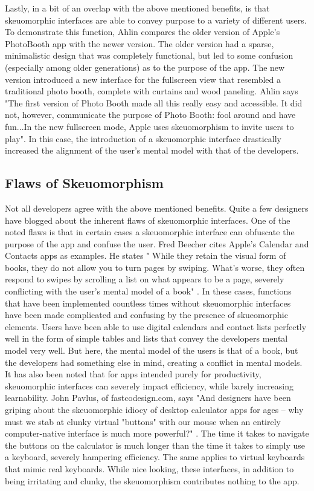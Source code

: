 \documentclass{article}
\begin{document}
	Lastly, in a bit of an overlap with the above mentioned benefits, is that skeuomorphic interfaces are able to convey purpose to a variety of different users. To demonstrate this function, Ahlin compares the older version of Apple's PhotoBooth app with the newer version. The older version had a sparse, minimalistic design that was completely functional, but led to some confusion (especially among older generations) as to the purpose of the app. The new version introduced a new interface for the fullscreen view that resembled a traditional photo booth, complete with curtains and wood paneling. Ahlin says "The first version of Photo Booth made all this really easy and accessible. It did not, however, communicate the purpose of Photo Booth: fool around and have fun...In the new fullscreen mode, Apple uses skeuomorphism to invite users to play"\cite{story}. In this case, the introduction of a skeuomorphic interface drastically increased the alignment of the user's mental model with that of the developers.

\subsection{Flaws of Skeuomorphism}

	Not all developers agree with the above mentioned benefits. Quite a few designers have blogged about the inherent flaws of skeuomorphic interfaces. One of the noted flaws is that in certain cases a skeuomorphic interface can obfuscate the purpose of the app and confuse the user. Fred Beecher cites Apple's Calendar and Contacts apps as examples. He states " While they retain the visual form of books, they do not allow you to turn pages by swiping. What's worse, they often respond to swipes by scrolling a list on what appears to be a page, severely conflicting with the user's mental model of a book" \cite{guidelines}. In these cases, functions that have been implemented countless times without skeuomorphic interfaces have been made complicated and confusing by the presence of skueomorphic elements. Users have been able to use digital calendars and contact lists perfectly well in the form of simple tables and lists that convey the developers mental model very well. But here, the mental model of the users is that of a book, but the developers had something else in mind, creating a conflict in mental models.
	It has also been noted that for apps intended purely for productivity, skeuomorphic interfaces can severely impact efficiency, while barely increasing learnability. John Pavlus, of fastcodesign.com, says "And designers have been griping about the skeuomorphic idiocy of desktop calculator apps for ages -- why must we stab at clunky virtual "buttons" with our mouse when an entirely computer-native interface is much more powerful?" \cite{codesign}. The time it takes to navigate the buttons on the calculator is much longer than the time it takes to simply use a keyboard, severely hampering efficiency. The same applies to virtual keyboards that mimic real keyboards. While nice looking, these interfaces, in addition to being irritating and clunky, the skeuomorphism contributes nothing to the app. 
\end{document}

